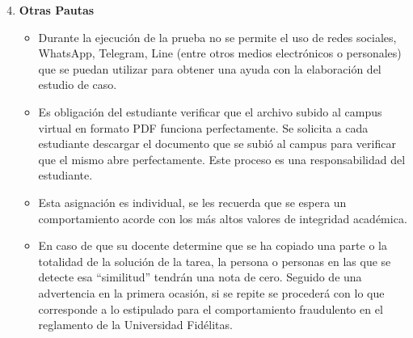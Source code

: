   \begin{center}
    \vspace{1.5cm}
    \thepage
  \end{center}
  \newpage
\begin{enumerate}
  \setcounter{enumi}{3}
\item \textbf{Otras Pautas}
  \begin{itemize}
    \item
      Durante la ejecución de la prueba no se permite el uso de redes sociales,
      WhatsApp, Telegram, Line (entre otros medios electrónicos o personales)
      que se puedan utilizar para obtener una ayuda con la elaboración del
      estudio de caso.
    \item
      Es obligación del estudiante verificar que el archivo subido al campus
      virtual en formato PDF funciona perfectamente.
      Se solicita a cada estudiante descargar el documento que se subió al
      campus para verificar que el mismo abre perfectamente.
      Este proceso es una responsabilidad del estudiante.
   \item
     Esta asignación es individual,
     se les recuerda que se espera un comportamiento acorde con
     los más altos valores de integridad académica.
    \item
      En caso de que su docente determine que se ha copiado una parte o
      la totalidad de la solución de la tarea,
      la persona o personas en las que se detecte esa “similitud”
      tendrán una nota de cero.
      Seguido de una advertencia en la primera ocasión,
      si se repite se procederá con lo que corresponde a lo estipulado para 
      el comportamiento fraudulento en el reglamento de la
      Universidad Fidélitas.
  \end{itemize}
\end{enumerate}

